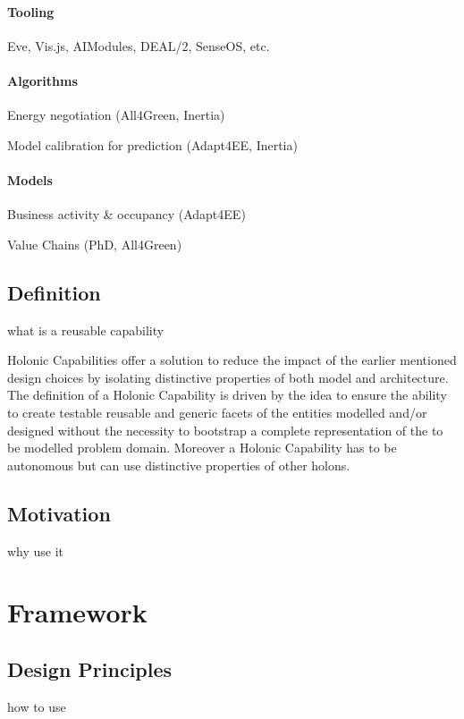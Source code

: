 \documentclass{aamas2015}
\begin{document}
\paragraph{Tooling}
Eve, Vis.js, AIModules, DEAL/2, SenseOS, etc.

\paragraph{Algorithms}

Energy negotiation (All4Green, Inertia)

Model calibration for prediction (Adapt4EE, Inertia)

\paragraph{Models}

Business activity \& occupancy (Adapt4EE)

Value Chains (PhD, All4Green)


\subsection{Definition}
what is a reusable capability

Holonic Capabilities offer a solution to reduce the impact of the earlier
mentioned design choices by isolating distinctive properties of both model and
architecture. The definition of a Holonic Capability is driven by the idea to
ensure the ability to create testable reusable and generic facets of the
entities modelled and/or designed without the necessity to bootstrap a complete
representation of the to be modelled problem domain.
Moreover a Holonic Capability has to be autonomous but can use distinctive
properties of other holons.


\subsection{Motivation}
why use it

\section{Framework}
\label{sec:framework}

\subsection{Design Principles}
how to use
\end{document}
